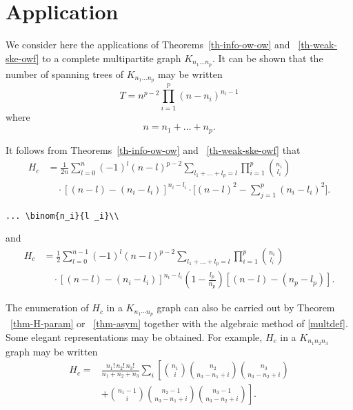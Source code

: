 \documentclass[draft]{amsart}
\theoremstyle{definition}
\theoremstyle{remark}
\begin{document}
\section{Application}
\label{lincomp}

We consider here the applications of Theorems~\ref{th-info-ow-ow} and
~\ref{th-weak-ske-owf} to a complete
multipartite graph $K_{n_1\dots n_p}$. It can be shown that the
number of spanning trees of $K_{n_1\dots n_p}$
may be written
\begin{equation}\label{e:st}
T=n^{p-2}\prod^p_{i=1}
(n-n_i)^{n_i-1}
\end{equation}
where
\begin{equation}
n=n_1+\dots+n_p.
\end{equation}

It follows from Theorems~\ref{th-info-ow-ow} and
~\ref{th-weak-ske-owf} that
\begin{equation}\label{e:barwq}
\begin{split}
H_c&=\frac1{2n}
\sum^n_{{l}=0}(-1)^{l}(n-{l})^{p-2}
\sum_{l _1+\dots+l _p=l}\prod^p_{i=1}
\binom{n_i}{l _i}\\
&\quad\cdot[(n-l )-(n_i-l _i)]^{n_i-l _i}\cdot
\biggl[(n-l )^2-\sum^p_{j=1}(n_i-l _i)^2\biggr].\end{split}
\end{equation}
\begin{verbatim}
... \binom{n_i}{l _i}\\
\end{verbatim}
and
\begin{equation}\label{joe}
\begin{split}
H_c&=\frac12\sum^{n-1}_{l =0}
(-1)^{l}(n-l )^{p-2}
\sum_{l _1+\dots+l _p=l}
\prod^p_{i=1}\binom{n_i}{l _i}\\
&\quad\cdot[(n-l )-(n_i-l _i)]^{n_i-l _i}
\left(1-\frac{l _p}{n_p}\right)
[(n-l )-(n_p-l _p)].
\end{split}
\end{equation}

The enumeration of $H_c$ in a $K_{n_1\dotsm n_p}$ graph can also be
carried out by Theorem ~\ref{thm-H-param} or ~\ref{thm-asym}
together with the algebraic method of \eqref{multdef}.
Some elegant representations may be obtained. For example, $H_c$ in
a $K_{n_1n_2n_3}$ graph may be written
\begin{equation}\label{j:mark}
\begin{split}
H_c=&
\frac{n_1!\,n_2!\,n_3!}
{n_1+n_2+n_3}\sum_i\left[\binom{n_1}{i}
\binom{n_2}{n_3-n_1+i}\binom{n_3}{n_3-n_2+i}\right.\\
&+\left.\binom{n_1-1}{i}
\binom{n_2-1}{n_3-n_1+i}
\binom{n_3-1}{n_3-n_2+i}\right].\end{split}
\end{equation}
\end{document}
